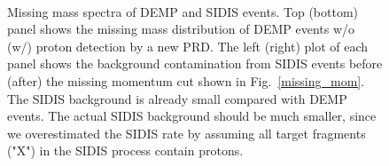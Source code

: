 \begin{figure}[!ht]
 \begin{center}
       \\
   \caption[Missing Mass]{\footnotesize{Missing mass spectra of DEMP and SIDIS events. Top (bottom) panel shows the missing mass distribution of DEMP events w/o (w/) proton detection by a new PRD. The left (right) plot of each panel shows the background contamination from SIDIS events before (after) the missing momentum cut shown in Fig.~\ref{missing_mom}. The SIDIS background is already small compared with DEMP events. The actual SIDIS background should be much smaller, since we overestimated the SIDIS rate by assuming all target fragments ("X") in the SIDIS process contain protons.}}
  \label{missing_mass}
  \end{center}
\end{figure}

